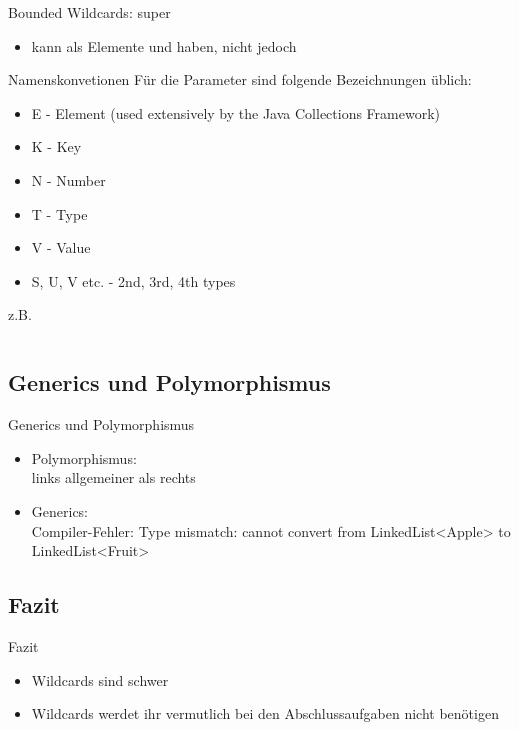 \documentclass[usepdftitle=false,hyperref={pdfpagelabels=false}]{beamer}
\begin{document}
\begin{frame}{Bounded Wildcards: super}
    \begin{itemize}[<+->]
        \item {} kann als Elemente
               und  haben, nicht jedoch
    \end{itemize}
\end{frame}

\begin{frame}{Namenskonvetionen}
    Für die Parameter sind folgende Bezeichnungen üblich:
    \begin{itemize}
        \item E - Element (used extensively by the Java Collections Framework)
        \item K - Key
        \item N - Number
        \item T - Type
        \item V - Value
        \item S, U, V etc. - 2nd, 3rd, 4th types
    \end{itemize}

    z.B.
    \inputminted[linenos=false, numbersep=5pt, tabsize=4, fontsize=\tiny, firstline=23, lastline=39]{java}{singleLines.java}
\end{frame}

\subsection{Generics und Polymorphismus}
\begin{frame}{Generics und Polymorphismus}
    \begin{itemize}
        \item Polymorphismus: \\
              {\tiny links allgemeiner als rechts}
        \item Generics: \\
              {\tiny Compiler-Fehler: Type mismatch: cannot convert from LinkedList<Apple> to LinkedList<Fruit>}
    \end{itemize}
\end{frame}

\subsection{Fazit}
\begin{frame}{Fazit}
    \begin{itemize}
        \item Wildcards sind schwer
        \item Wildcards werdet ihr vermutlich bei den Abschlussaufgaben
              nicht benötigen
    \end{itemize}
\end{frame}
\end{document}
